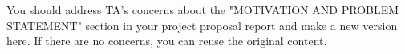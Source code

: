 You should address TA's concerns about the "MOTIVATION AND PROBLEM STATEMENT" section in your project proposal report and make a new version here. If there are no concerns, you can reuse the original content.

